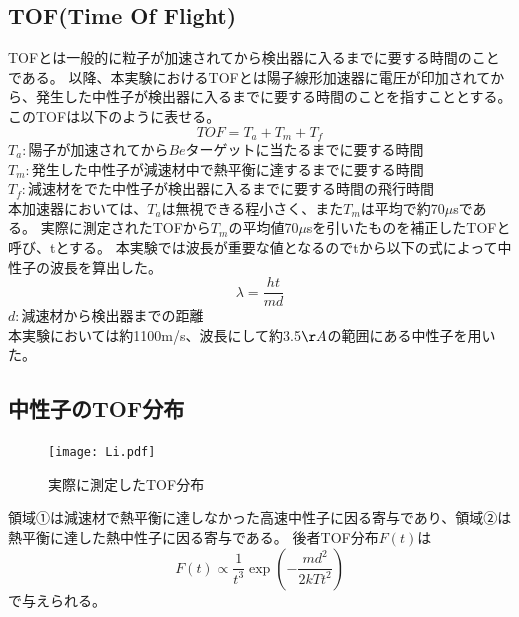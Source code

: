 \subsection {TOF(Time Of Flight)}
TOFとは一般的に粒子が加速されてから検出器に入るまでに要する時間のことである。
以降、本実験におけるTOFとは陽子線形加速器に電圧が印加されてから、発生した中性子が検出器に入るまでに要する時間のことを指すこととする。
このTOFは以下のように表せる。
\begin{equation}TOF=T_a+T_m+T_f\end{equation}
$T_a:陽子が加速されてからBeターゲットに当たるまでに要する時間$\\
$T_m:発生した中性子が減速材中で熱平衡に達するまでに要する時間$\\
$T_f:減速材をでた中性子が検出器に入るまでに要する時間の飛行時間$\\
本加速器においては、$T_a$は無視できる程小さく、また$T_m$は平均で約70$\mu$sである。
実際に測定されたTOFから$T_m$の平均値70$\mu$sを引いたものを補正したTOFと呼び、tとする。
本実験では波長が重要な値となるのでtから以下の式によって中性子の波長を算出した。
\begin{equation}
{\lambda}={\frac{ht}{md}}
\end{equation}
$d:減速材から検出器までの距離$\\
本実験においては約1100m/s、波長にして約3.5$\AA$の範囲にある中性子を用いた。
\subsection {中性子のTOF分布}
\begin{figure}[h]
\centering
\texttt{[image: Li.pdf]}
\caption{実際に測定したTOF分布}
\end{figure}
領域①は減速材で熱平衡に達しなかった高速中性子に因る寄与であり、領域②は熱平衡に達した熱中性子に因る寄与である。
後者TOF分布$F(t)$は\begin{equation}F(t)\propto \frac{1}{t^{3}}\exp(-\frac{md^2}{2kTt^2}) \end{equation}で与えられる。
